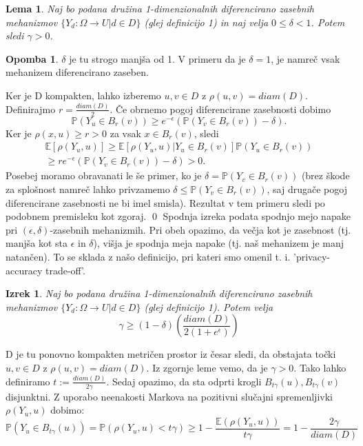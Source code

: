 \documentclass[12pt,a4paper]{amsart}
\theoremstyle{definition} %
\newtheorem{opomba}[definicija]{Opomba}
\theoremstyle{plain} %
\newtheorem{lema}[definicija]{Lema}
\newtheorem{izrek}[definicija]{Izrek}
\begin{document}
\begin{lema}
 Naj bo podana družina 1-dimenzionalnih diferencirano zasebnih mehanizmov $\{ Y_d: \Omega \rightarrow U | d \in D\}$ (glej definicijo 1) in naj velja $0 \leq \delta < 1$. Potem sledi $\gamma > 0$.
\end{lema}
\begin{opomba}
 $\delta$ je tu strogo manjša od 1. V primeru da je $\delta = 1$, je namreč vsak mehanizem diferencirano zaseben.
 \end{opomba}
\proof
 Ker je D kompakten, lahko izberemo $u,v \in D$ z $\rho(u,v)=diam(D)$. Definirajmo $r=\frac{diam(D)}{2}$. Če obrnemo pogoj diferencirane zasebnosti dobimo $$\mathbb{P}(Y_u \in B_r(v)) \geq e^{-\epsilon}(\mathbb{P}(Y_v \in B_r(v)) -\delta).$$ Ker je $\rho(x,u) \geq r > 0$ za vsak $x \in B_r(v)$, sledi 
\begin{equation*}
\begin{split}
\mathbb{E}[\rho(Y_u,u)] \geq \mathbb{E}[\rho(Y_u,u) | Y_u \in B_r(v)] \mathbb{P}(Y_u \in B_r(v)) \\
\geq r e^{-\epsilon}(\mathbb{P}(Y_v \in B_r(v)) -\delta) > 0.
\end{split}
\end{equation*}
Posebej moramo obravanati le še primer, ko je $\delta = \mathbb{P}(Y_v \in B_r(v))$ (brez škode za splošnost namreč lahko privzamemo $\delta \leq \mathbb{P}(Y_v \in B_r(v))$, saj drugače pogoj diferencirane zasebnosti ne bi imel smisla). Rezultat v tem primeru sledi po podobnem premisleku kot zgoraj.
\qed
\newline
\newline
Spodnja izreka podata spodnjo mejo napake pri $(\epsilon, \delta)$-zasebnih mehanizmih. Pri obeh opazimo, da večja kot je zasebnost (tj. manjša kot sta $\epsilon$ in $\delta$), višja je spodnja meja napake (tj. naš mehanizem je manj natančen). To se sklada z našo definicijo, pri kateri smo omenil t. i. 'privacy-accuracy trade-off'.
\begin{izrek}
 Naj bo podana družina 1-dimenzionalnih diferencirano zasebnih mehanizmov $\{ Y_d: \Omega \rightarrow U | d \in D\}$ (glej definicijo 1). Potem velja $$\gamma  \geq (1-\delta)(\frac{diam(D)}{2(1+e^\epsilon)})$$
\end{izrek}
\proof
D je tu ponovno kompakten metričen prostor iz česar sledi, da obstajata točki $u, v \in D$ z $\rho(u,v) = diam(D)$. Iz zgornje leme vemo, da je $\gamma > 0$. Tako lahko definiramo $t := \frac{diam(D)}{2\gamma}$. Sedaj opazimo, da sta odprti krogli $B_{t\gamma}(u), B_{t\gamma}(v) $ disjunktni. Z uporabo neenakosti Markova na pozitivni slučajni spremenljivki $\rho(Y_u, u)$ dobimo: $$\mathbb{P}(Y_u \in B_{t\gamma}(u)) = \mathbb{P}(\rho(Y_u,u) < t\gamma) \geq 1 - \frac{\mathbb{E}(\rho(Y_u,u))}{t\gamma} = 1 - \frac{2\gamma}{diam(D)} $$ 
\end{document}
